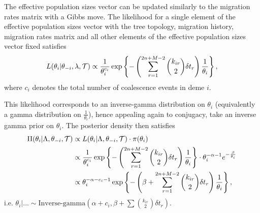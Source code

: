 The effective population sizes vector can be updated similarly to the migration rates matrix with a Gibbs move. The likelihood for a single element of the effective population sizes vector with the tree topology, migration history, migration rates matrix and all other elements of the effective population sizes vector fixed satisfies
	\[
		L(\theta_i | \theta_{-i}, \lambda, \mathcal{T}) \propto \frac{1}{\theta_i^{c_i}} \exp \left\{ - \left( \sum_{r=1}^{2n+M-2} \binom{k_{ir}}{2} \delta t_r \right) \frac{1}{\theta_i} \right\},
	\]
where $c_i$ denotes the total number of coalescence events in deme $i$.

This likelihood corresponds to an inverse-gamma distribution on $\theta_i$ (equivalently a gamma distribution on $\frac{1}{\theta_i}$), hence appealing again to conjugacy, take an inverse gamma prior on $\theta_i$. The posterior density then satisfies
	\begin{align*}
		\Pi(\theta_i | \Lambda, \theta_{-i}, \mathcal{T}) & \propto L(\theta_i | \Lambda, \theta_{-i}, \mathcal{T}) \cdot \pi(\theta_i) \\
		& \propto \frac{1}{\theta_i^{c_i}} \exp \left\{ - \left( \sum_{r=1}^{2n+M-2} \binom{k_{ir}}{2} \delta t_r \right) \frac{1}{\theta_i} \right\} \cdot \theta_i^{-\alpha - 1} e^{- \frac{\beta}{\theta_i}} \\
		& \propto \theta_i^{-\alpha - c_i - 1} \exp \left\{ - \left( \beta + \sum_{r=1}^{2n + M - 2} \binom{k_{ir}}{2} \delta t_r \right) \frac{1}{\theta_i} \right\},
	\end{align*}
i.e. $\theta_i | ... \sim \text{Inverse-gamma} (\alpha + c_i, \beta + \sum \binom{k_{ir}}{2} \delta t_r)$.